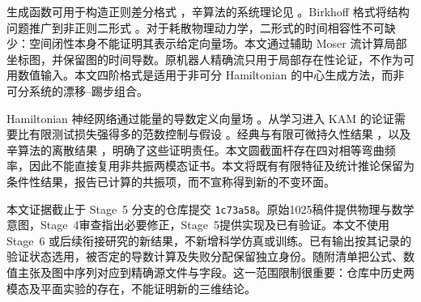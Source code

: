 生成函数可用于构造正则差分格式 \citep{Feng1989}，辛算法的系统理论见 \citet{FengQin2010,Hairer2006}。Birkhoff 格式将结构问题推广到非正则二形式 \citep{Su2007}。对于耗散物理动力学，二形式的时间相容性不可缺少：空间闭性本身不能证明其表示给定向量场。本文通过辅助 Moser 流计算局部坐标图，并保留图的时间导数。原机器人精确流只用于局部存在性论证，不作为可用数值输入。本文四阶格式是适用于非可分 Hamiltonian 的中心生成方法，而非可分系统的漂移--踢步组合。

Hamiltonian 神经网络通过能量的导数定义向量场 \citep{Greydanus2019}。从学习进入 KAM 的论证需要比有限测试损失强得多的范数控制与假设 \citep{Chen2022}。经典与有限可微持久性结果 \citep{Poschel2001,Bounemoura2020}，以及辛算法的离散结果 \citep{Shang1999}，明确了这些证明责任。本文圆截面杆存在四对相等弯曲频率，因此不能直接复用非共振两模态证书。本文将既有有限特征及统计推论保留为条件性结果，报告已计算的共振项，而不宣称得到新的不变环面。

本文证据截止于 Stage~5 分支的仓库提交 \texttt{1c73a58}。原始1025稿件提供物理与数学意图，Stage~4审查指出必要修正，Stage~5提供实现及已有验证。本文不使用 Stage~6 或后续衔接研究的新结果，不新增科学仿真或训练。已有输出按其记录的验证状态选用，被否定的导数计算及失败分配保留独立身份。随附清单把公式、数值主张及图中序列对应到精确源文件与字段。这一范围限制很重要：仓库中历史两模态及平面实验的存在，不能证明新的三维结论。
